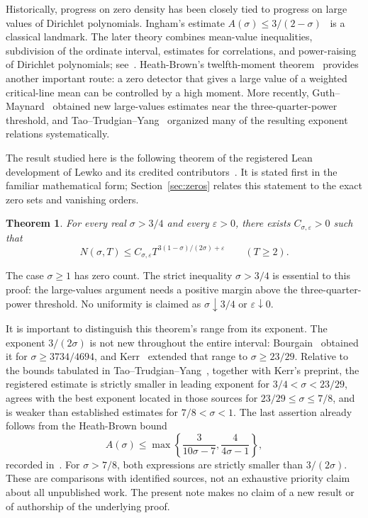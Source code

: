 \documentclass[11pt,a4paper]{article}
\numberwithin{equation}{section}
\newtheorem{theorem}{Theorem}[section]
\theoremstyle{definition}
\begin{document}
Historically, progress on zero density has been closely tied to progress on
large values of Dirichlet polynomials. Ingham's estimate
$A(\sigma)\le3/(2-\sigma)$~\cite{ingham} is a classical landmark.
The later theory combines mean-value inequalities, subdivision of the
ordinate interval, estimates for correlations, and power-raising of
Dirichlet polynomials; see~\cite{ivic,ik,montgomery}.
Heath-Brown's twelfth-moment theorem~\cite{hb78} provides another important
route: a zero detector that gives a large value of a weighted critical-line
mean can be controlled by a high moment. More recently,
Guth--Maynard~\cite{gm} obtained new large-values estimates near the
three-quarter-power threshold, and Tao--Trudgian--Yang~\cite{tty}
organized many of the resulting exponent relations systematically.

The result studied here is the following theorem of the registered
Lean development of Lewko and its credited contributors~\cite{source,registry}.
It is stated first in the familiar mathematical form; Section~\ref{sec:zeros}
relates this statement to the exact zero sets and vanishing orders.
\begin{theorem}\label{thm:main}
For every real $\sigma>3/4$ and every $\varepsilon>0$, there exists
$C_{\sigma,\varepsilon}>0$ such that
\[
 N(\sigma,T)\le C_{\sigma,\varepsilon}
          T^{3(1-\sigma)/(2\sigma)+\varepsilon}
 \qquad(T\ge2).
\]
\end{theorem}
The case $\sigma\ge1$ has zero count. The strict inequality
$\sigma>3/4$ is essential to this proof: the large-values argument needs a
positive margin above the three-quarter-power threshold. No uniformity is
claimed as $\sigma\downarrow3/4$ or $\varepsilon\downarrow0$.

It is important to distinguish this theorem's range from its exponent.
The exponent $3/(2\sigma)$ is not new throughout the entire interval:
Bourgain~\cite{bourgain} obtained it for
$\sigma\ge3734/4694$, and Kerr~\cite[Theorem 6]{kerr} extended that range to
$\sigma\ge23/29$. Relative to the bounds tabulated in
Tao--Trudgian--Yang~\cite[Table 2]{tty}, together with Kerr's preprint, the
registered estimate is strictly smaller in leading exponent for
$3/4<\sigma<23/29$, agrees with the best exponent located in those sources
for $23/29\le\sigma\le7/8$, and is weaker than established estimates for
$7/8<\sigma<1$. The last assertion already follows from the
Heath-Brown bound
\[
 A(\sigma)\le\max\left\{\frac3{10\sigma-7},\frac4{4\sigma-1}\right\},
\]
recorded in~\cite{hb79,tty}. For $\sigma>7/8$, both expressions are
strictly smaller than $3/(2\sigma)$. These are comparisons with identified
sources, not an exhaustive priority claim about all unpublished work.
The present note makes no claim of a new result or of authorship of the
underlying proof.
\end{document}
